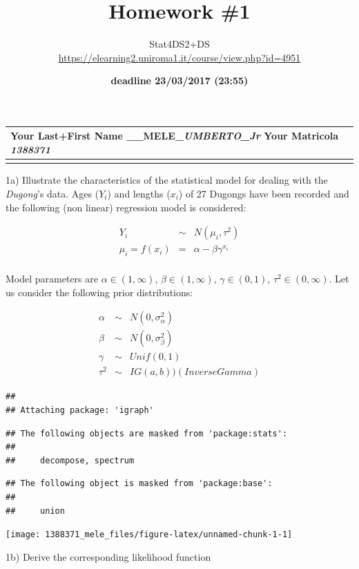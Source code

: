 \documentclass[]{article}
\title{Homework \#1}
\author{Stat4DS2+DS\\
\url{https://elearning2.uniroma1.it/course/view.php?id=4951}}
\date{\textbf{deadline 23/03/2017 (23:55)}}
\begin{document}
\maketitle

{
\setcounter{tocdepth}{2}
\tableofcontents
}
\begin{longtable}[]{@{}l@{}}
\toprule
Your Last+First Name \_\_MELE\_\emph{UMBERTO\_Jr} Your Matricola
\emph{1388371}\tabularnewline
\midrule
\endhead
\newpage\tabularnewline
\bottomrule
\end{longtable}

1a) Illustrate the characteristics of the statistical model for dealing
with the \emph{Dugong}'s data. Ages (\(Y_i\)) and lengths (\(x_i\)) of
27 Dugongs have been recorded and the following (non linear) regression
model is considered:

\begin{eqnarray*}
Y_i &\sim& N(\mu_i, \tau^2) \\
\mu_i=f(x_i)&=& \alpha - \beta \gamma^{x_i}\\
\end{eqnarray*}

Model parameters are \(\alpha \in (1, \infty)\),
\(\beta \in (1, \infty)\), \(\gamma \in (0,1)\),
\(\tau^2 \in (0,\infty)\). Let us consider the following prior
distributions:

\begin{eqnarray*}
\alpha &\sim&  N(0,\sigma^2_{\alpha})\\
\beta  &\sim&  N(0,\sigma^2_{\beta}) \\
\gamma &\sim&  Unif(0,1)\\
\tau^2 &\sim&  IG(a,b)) (Inverse Gamma)
\end{eqnarray*}

\begin{verbatim}
## 
## Attaching package: 'igraph'
\end{verbatim}

\begin{verbatim}
## The following objects are masked from 'package:stats':
## 
##     decompose, spectrum
\end{verbatim}

\begin{verbatim}
## The following object is masked from 'package:base':
## 
##     union
\end{verbatim}

\texttt{[image: 1388371\_mele\_files/figure-latex/unnamed-chunk-1-1]}

1b) Derive the corresponding likelihood function
\end{document}
